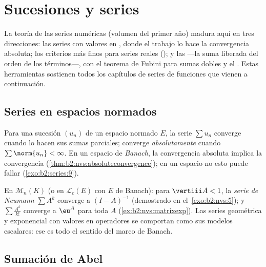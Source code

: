 \chapter{Sucesiones y series}\label{ch:b2:series}

La teoría de las series numéricas (volumen del primer año) madura aquí
en tres direcciones: las series con valores en ,
donde el trabajo lo hace la convergencia absoluta; los criterios más
finos para series reales (); y las \emph{} ---la suma liberada del orden de los términos---, con el
teorema de Fubini para sumas dobles y el . Estas
herramientas sostienen todos los capítulos de series de funciones que
vienen a continuación.

\section{Series en espacios normados}

\begin{definition}\label{def:b2:series:def}
Para una sucesión $(u_n)$ de un espacio normado $E$, la serie $\sum
u_n$ converge cuando lo hacen sus sumas parciales; converge
\emph{absolutamente} cuando $\sum \norm{u_n} < \infty$. En un espacio de
\emph{Banach}, la convergencia absoluta implica la convergencia
(\cref{thm:b2:nvs:absoluteconvergence}); en un espacio
no  esto puede fallar (\cref{exo:b2:series:9}).
\end{definition}

\begin{example}\label{ex:b2:series:neumann}
En $\mathcal{M}_n(K)$ (o en $\mathcal{L}_c(E)$ con $E$ de Banach):
para $\vertiii A < 1$, la \emph{serie de Neumann} $\sum A^k$
converge  a $(I - A)^{-1}$ (demostrado en el~\cref{exo:b2:nvs:5}); y $\sum \frac{A^k}{k!}$ converge
 a $\eu^A$ para toda $A$
(\cref{ex:b2:nvs:matrixexp}). Las series geométrica y exponencial
con valores en operadores se comportan como sus modelos escalares:
ese es todo el sentido del marco de Banach.
\end{example}

\section{Sumación de Abel}


